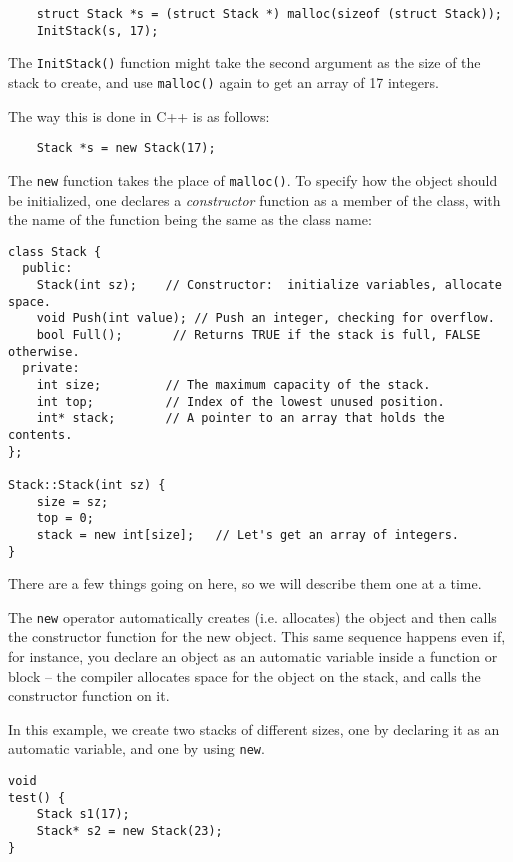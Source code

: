 \begin{enumerate}
\begin{verbatim}
    struct Stack *s = (struct Stack *) malloc(sizeof (struct Stack));
    InitStack(s, 17);
\end{verbatim}

The {\tt InitStack()} function might take the second argument as the
size of the stack to create, and use {\tt malloc()} again to get an
array of 17 integers.

The way this is done in C++ is as follows:

\begin{verbatim}
    Stack *s = new Stack(17);
\end{verbatim}

The {\tt new} function takes the place of {\tt malloc()}.  To
specify how the object should be initialized, one declares a {\it
constructor} function as a member of the class, with the name of the
function being the same as the class name:

\begin{verbatim}
class Stack {
  public:
    Stack(int sz);    // Constructor:  initialize variables, allocate space.
    void Push(int value); // Push an integer, checking for overflow.
    bool Full();       // Returns TRUE if the stack is full, FALSE otherwise.
  private:
    int size;         // The maximum capacity of the stack.
    int top;          // Index of the lowest unused position.
    int* stack;       // A pointer to an array that holds the contents.
};

Stack::Stack(int sz) {
    size = sz;
    top = 0;
    stack = new int[size];   // Let's get an array of integers.
}
\end{verbatim}

There are a few things going on here, so we will describe them one at
a time.

The {\tt new} operator automatically creates (i.e. allocates) the object
and then calls the constructor function for the new object.
This same sequence happens even if, for instance, you declare an object
as an automatic variable inside a function or block -- the compiler allocates
space for the object on the stack, and calls the constructor function on it.

In this example, we create two stacks of different sizes, one
by declaring it as an automatic variable, and one by using {\tt new}.

\begin{verbatim}
void
test() {
    Stack s1(17);
    Stack* s2 = new Stack(23);
}
\end{verbatim}


\end{enumerate}
